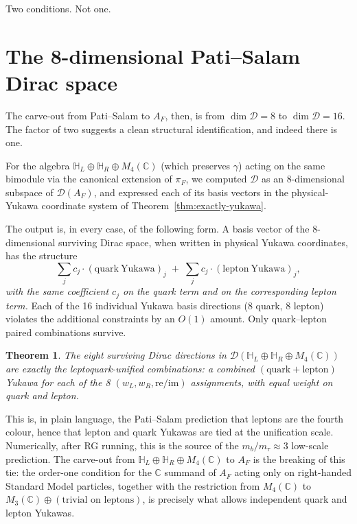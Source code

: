 \documentclass[11pt,a4paper]{article}
\newtheorem{theorem}{Theorem}
\begin{document}
Two conditions. Not one.

\section{The 8-dimensional Pati--Salam Dirac space}\label{sec:ps8dim}

The carve-out from Pati--Salam to $A_F$, then, is from $\dim \mathcal{D}
= 8$ to $\dim \mathcal{D} = 16$. The factor of two suggests a clean structural
identification, and indeed there is one.

For the algebra $\mathbb{H}_L \oplus \mathbb{H}_R \oplus M_4(\mathbb{C})$
(which preserves $\gamma$) acting on the same bimodule via the canonical
extension of $\pi_F$, we computed $\mathcal{D}$ as an 8-dimensional subspace
of $\mathcal{D}(A_F)$, and expressed each of its basis vectors in the
physical-Yukawa coordinate system of Theorem~\ref{thm:exactly-yukawa}.

The output is, in every case, of the following form. A basis vector of the
8-dimensional surviving Dirac space, when written in physical Yukawa
coordinates, has the structure
\[
  \sum_{j} c_j \cdot (\mathrm{quark\ Yukawa})_j
  \;+\;
  \sum_{j} c_j \cdot (\mathrm{lepton\ Yukawa})_j,
\]
\emph{with the same coefficient $c_j$ on the quark term and on the corresponding
lepton term.} Each of the 16 individual Yukawa basis directions (8 quark,
8 lepton) violates the additional constraints by an $O(1)$ amount. Only
quark--lepton paired combinations survive.

\begin{theorem}\label{thm:ps-leptoquark}
The eight surviving Dirac directions in $\mathcal{D}(\mathbb{H}_L \oplus
\mathbb{H}_R \oplus M_4(\mathbb{C}))$ are exactly the leptoquark-unified
combinations: a combined $(\mathrm{quark} + \mathrm{lepton})$ Yukawa for each
of the 8 $(w_L, w_R, \mathrm{re}/\mathrm{im})$ assignments, with equal weight
on quark and lepton.
\end{theorem}

This is, in plain language, the Pati--Salam prediction that leptons are the
fourth colour, hence that lepton and quark Yukawas are tied at the unification
scale. Numerically, after RG running, this is the source of the
$m_b/m_\tau \approx 3$ low-scale prediction. The carve-out from
$\mathbb{H}_L \oplus \mathbb{H}_R \oplus M_4(\mathbb{C})$ to $A_F$ is the
breaking of this tie: the order-one condition for the $\mathbb{C}$ summand of
$A_F$ acting only on right-handed Standard Model particles, together with the
restriction from $M_4(\mathbb{C})$ to $M_3(\mathbb{C}) \oplus (\text{trivial on
leptons})$, is precisely what allows independent quark and lepton Yukawas.
\end{document}
